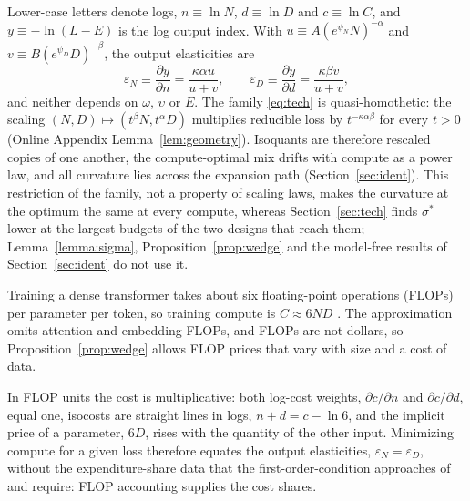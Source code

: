 Lower-case letters denote logs, $n\equiv\ln N$, $d\equiv\ln D$ and $c\equiv\ln C$, and $y\equiv-\ln(L-E)$ is the log
output index. With $u\equiv A(e^{\psi_N}N)^{-\alpha}$ and $v\equiv B(e^{\psi_D}D)^{-\beta}$, the output elasticities are
\begin{equation}\label{eq:elast}
\varepsilon_N\equiv\frac{\partial y}{\partial n}=\frac{\kappa\alpha u}{u+v},\qquad
\varepsilon_D\equiv\frac{\partial y}{\partial d}=\frac{\kappa\beta v}{u+v},
\end{equation}
and neither depends on $\omega$, $\upsilon$ or $E$. The family \eqref{eq:tech} is quasi-homothetic: the scaling
$(N,D)\mapsto(t^{\beta}N,t^{\alpha}D)$ multiplies reducible loss by $t^{-\kappa\alpha\beta}$ for every $t>0$ (Online
Appendix Lemma~\ref{lem:geometry}). Isoquants are therefore rescaled copies of one another, the compute-optimal mix
drifts with compute as a power law, and all curvature lies across the expansion path (Section~\ref{sec:ident}). This
restriction of the family, not a property of scaling laws, makes the curvature at the optimum the same at every compute,
whereas Section~\ref{sec:tech} finds $\sigma^*$ lower at the largest budgets of the two designs that reach them;
Lemma~\ref{lemma:sigma}, Proposition~\ref{prop:wedge} and the model-free results of Section~\ref{sec:ident} do not use
it.

Training a dense transformer takes about six floating-point operations (FLOPs) per parameter per token, so training
compute is $C\approx6ND$ \citep{kaplan2020scaling}. The approximation omits attention and embedding FLOPs,
and FLOPs are not dollars, so Proposition~\ref{prop:wedge} allows FLOP prices that vary with size and a cost of data.

In FLOP units the cost is multiplicative: both log-cost weights, $\partial c/\partial n$ and $\partial c/\partial d$,
equal one, isocosts are straight lines in logs, $n+d=c-\ln6$, and the implicit price of a parameter, $6D$, rises with the
quantity of the other input. Minimizing compute for a given loss therefore equates the output elasticities,
$\varepsilon_N=\varepsilon_D$, without the expenditure-share data that the first-order-condition approaches of
\citet{deloecker2012markups} and \citet{gandhi2020identification} require: FLOP accounting supplies the cost shares.

